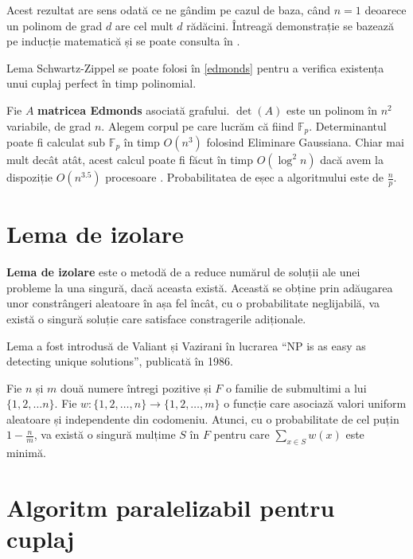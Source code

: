 Acest rezultat are sens odată ce ne gândim pe cazul de baza, când $n=1$ deoarece
un polinom de grad $d$ are cel mult $d$ rădăcini. Întreagă demonstrație se
bazează pe inducție matematică și se poate consulta în \cite{schwartzzippel}.

\begin{thm}
  Lema Schwartz-Zippel se poate folosi în \ref{edmonds} pentru a verifica
  existența unui cuplaj perfect în timp polinomial.
\end{thm}

Fie $A$ \textbf{matricea Edmonds} asociată grafului. $\det(A)$ este un polinom
în $n^{2}$ variabile, de grad $n$. Alegem corpul pe care lucrăm că fiind
$\mathbb{F}_{p}$. Determinantul poate fi calculat sub $\mathbb{F}_{p}$ în timp $O(n^{3})$
folosind Eliminare Gaussiana. Chiar mai mult decât atât, acest calcul
poate fi făcut în timp $O(\log^{2} n)$ dacă avem la dispoziție $O(n^{3.5})$
procesoare \cite{paralleldet}. Probabilitatea de eșec a algoritmului este de $\frac{n}{p}$.

\pagebreak

\section{Lema de izolare}
\textbf{Lema de izolare} este o metodă de a reduce numărul de soluții ale unei
probleme la una singură, dacă aceasta există. Această se obține prin adăugarea
unor constrângeri aleatoare în așa fel încât, cu o probabilitate neglijabilă,
va există o singură soluție care satisface constragerile adiționale.

Lema a fost introdusă de Valiant și Vazirani în lucrarea ``NP is as easy as
detecting unique solutions'', publicată în 1986.

\begin{thm}
  \label{isolation}
  Fie $n$ și $m$ două numere întregi pozitive și $F$ o familie de submultimi a
  lui $\{1, 2, \ldots n\}$. Fie
  $w : \{1, 2, \ldots, n\} \to \{1, 2, \ldots, m\}$ o funcție care asociază
  valori uniform aleatoare și independente din codomeniu. Atunci, cu o
  probabilitate de cel puțin $1 - \frac{n}{m}$, va există o singură mulțime $S$ în
  $F$ pentru care $\displaystyle\sum\limits_{x\in S}{w(x)}$ este minimă.
\end{thm}

\pagebreak

\section{Algoritm paralelizabil pentru cuplaj}
\label{Algoritm paralelizabil pentru cuplaj}

